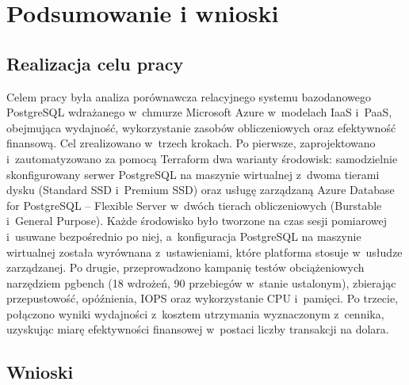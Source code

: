 
\chapter{Podsumowanie i wnioski}
\label{ch:podsumowanie}

\section{Realizacja celu pracy}
\label{sec:podsumowanie-cel}

Celem pracy była analiza porównawcza relacyjnego systemu bazodanowego PostgreSQL wdrażanego
w~chmurze Microsoft Azure w~modelach IaaS i~PaaS, obejmująca wydajność, wykorzystanie zasobów
obliczeniowych oraz efektywność finansową. Cel zrealizowano w~trzech krokach. Po pierwsze,
zaprojektowano i~zautomatyzowano za pomocą Terraform dwa warianty środowisk: samodzielnie
skonfigurowany serwer PostgreSQL na maszynie wirtualnej z~dwoma tierami dysku (Standard SSD
i~Premium SSD) oraz usługę zarządzaną Azure Database for PostgreSQL -- Flexible Server
w~dwóch tierach obliczeniowych (Burstable i~General Purpose). Każde środowisko było tworzone
na czas sesji pomiarowej i~usuwane bezpośrednio po niej, a~konfiguracja PostgreSQL na
maszynie wirtualnej została wyrównana z~ustawieniami, które platforma stosuje w~usłudze
zarządzanej. Po drugie, przeprowadzono kampanię testów obciążeniowych narzędziem pgbench
(18 wdrożeń, 90 przebiegów w~stanie ustalonym), zbierając przepustowość, opóźnienia, IOPS
oraz wykorzystanie CPU i~pamięci. Po trzecie, połączono wyniki wydajności z~kosztem
utrzymania wyznaczonym z~cennika, uzyskując miarę efektywności finansowej w~postaci liczby
transakcji na dolara.

\section{Wnioski}
\label{sec:podsumowanie-wnioski}

